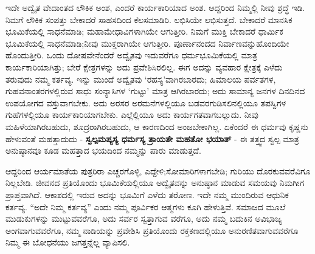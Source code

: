 ಇದೇ ಅದ್ವೈತ ವೇದಾಂತದ ಲೌಕಿಕ ಅಂಶ, ಎಂದರೆ ಕಾರ್ಯಕಾರಿಯಾದ ಅಂಶ. ಆದ್ದರಿಂದ ನಿಮ್ಮಲ್ಲಿ ನೀವು ಶ್ರದ್ಧೆ ಇಡಿ. ನಿಮಗೆ ಲೌಕಿಕ ಸಂಪತ್ತು ಬೇಕಾದರೆ ಸಾಹಸದಿಂದ ಕೆಲಸಮಾಡಿರಿ. ಲಭಿಸಿಯೇ ಲಭಿಸುತ್ತದೆ. ಬೇಕಾದರೆ ಮಾನಸಿಕ ಭೂಮಿಕೆಯಲ್ಲಿ ಸಾಧನೆಮಾಡಿ; ಮಹಾಮೇಧಾವಿಗಳಾಗಿಯೇ ಆಗುತ್ತೀರಿ. ನಿಮಗೆ ಮುಕ್ತಿ ಬೇಕಾದರೆ ಧಾರ್ಮಿಕ ಭೂಮಿಕೆಯಲ್ಲಿ ಸಾಧನೆಮಾಡಿ;\break ನೀವು ಮುಕ್ತರಾಗಿಯೇ ಆಗುತ್ತೀರಿ. ಪೂರ್ಣಾನಂದದ ನಿರ್ವಾಣವನ್ನು\break ಹೊಂದಿಯೇ ಹೊಂದುತ್ತೀರಿ. ಒಂದು ದೋಷವೇನೆಂದರೆ ಅದ್ವೈತವು ಇದುವರೆಗೂ ಧರ್ಮಭೂಮಿಕೆಯಲ್ಲಿ ಮಾತ್ರ ಕಾರ್ಯಕಾರಿಯಾಗಿತ್ತು; ಬೇರೆ ಕ್ಷೇತ್ರಗಳನ್ನು ಅದು ಪ್ರವೇಶಿಸಿರಲಿಲ್ಲ. ಈಗ ಅದನ್ನು ವ್ಯವಹಾರ ಕ್ಷೇತ್ರಕ್ಕೆ ಎಳೆದು ತರುವುದು ನಮ್ಮ ಕರ್ತವ್ಯ. ಇನ್ನು ಮುಂದೆ ಅದ್ವೈತವು ‘ರಹಸ್ಯ’ವಾಗಿರ\-ಬಾರದು; ಹಿಮಾಲಯ ಪರ್ವತಗಳ, ಗುಹವನಾಂತರಗಳಲ್ಲಿರುವ ಸಾಧು ಸಂನ್ಯಾಸಿಗಳ ‘ಗುಟ್ಟು’ ಮಾತ್ರ ಆಗಿರಬಾರದು; ಅದು ಸಾಮಾನ್ಯ ಜನಗಳ ದಿನದಿನದ ಉಪಯೋಗದ ವಸ್ತುವಾಗಬೇಕು. ಅದು ಅರಸರ ಅರಮನೆಗಳಲ್ಲಿಯೂ ಬಡವರ\break ಗುಡಿಸಲಿನಲ್ಲಿಯೂ ತಪಸ್ವಿಗಳ ಗುಹೆಗಳಲ್ಲಿಯೂ ಕಾರ್ಯಕಾರಿಯಾಗಬೇಕು. ಎಲ್ಲೆಲ್ಲಿಯೂ ಅದು ಕಾರ್ಯಗತವಾಗಬಲ್ಲುದು. ನೀವು ಮಹಿಳೆಯಾಗಿರಬಹುದು, ಶೂದ್ರರಾಗಿರಬಹುದು, ಆ ಕಾರಣದಿಂದ ಅಂಜಬೇಕಾಗಿಲ್ಲ. ಏಕೆಂದರೆ ಈ ಧರ್ಮವು ಕೃಷ್ಣನು ಹೇಳುವಂತೆ ಮಹತ್ತಾದುದು - \textbf{ಸ್ವಲ್ಪಮಪ್ಯಸ್ಯ ಧರ್ಮಸ್ಯ ತ್ರಾಯತೇ ಮಹತೋ ಭಯಾತ್​} - ಈ ತತ್ತ್ವದ ಸ್ವಲ್ಪ ಮಾತ್ರ ಅನುಷ್ಠಾನವೂ ಕೂಡ ಮಹತ್ತಾದ ಭಯದಿಂದ ನಮ್ಮನ್ನು ಪಾರು ಮಾಡುತ್ತದೆ.

ಆದ್ದರಿಂದ ಆರ್ಯಮಾತೆಯ ಪುತ್ರರಿರಾ ಎಚ್ಚರಗೊಳ್ಳಿ, ಎದ್ದೇಳಿ;\break ಸೋಮಾರಿಗಳಾಗಬೇಡಿ; ಗುರಿಯು ದೊರಕುವವರೆವಿಗೂ ನಿಲ್ಲಬೇಡಿ. ಜೀವನದ ಪ್ರತಿಯೊಂದು ಭೂಮಿಕೆಯಲ್ಲಿಯೂ ಅದ್ವೈತವನ್ನು ಅನುಷ್ಠಾನ ಮಾಡುವ ಸಮಯವು ನಿಮಗೀಗ ಪ್ರಾಪ್ತವಾಗಿದೆ. ಆಕಾಶದಲ್ಲಿ ಇರುವ ಅದನ್ನು ಭೂಮಿಗೆ ಎಳೆದು ತರೋಣ. ಇದೇ ನಮ್ಮ ಮುಂದಿರುವ ಆಧುನಿಕ ಕರ್ತವ್ಯ. “ಅದೇ ನಿಮ್ಮ ಕರ್ತವ್ಯ” ಎಂದು ನಮ್ಮ ಪೂರ್ವಿಕರ ಆತ್ಮಗಳು ಕೂಗಿ ಹೇಳುತ್ತಿವೆ. ಸಮಾಜದ ಮೂಲೆ ಮುಡುಕುಗಳನ್ನು ಮುಟ್ಟುವವರೆಗೂ, ಅದು ಸರ್ವರ ಸ್ವತ್ತಾಗುವ ವರೆಗೂ, ಅದು ನಮ್ಮ ಬದುಕಿನ ಅವಿಭಾಜ್ಯ ಅಂಗವಾಗುವವರೆಗೂ, ನಮ್ಮ ನಾಡಿಯನ್ನು ಪ್ರವೇಶಿಸಿ ಪ್ರತಿಯೊಂದು ರಕ್ತಕಣದಲ್ಲಿಯೂ ಅನುರಣಿತವಾಗುವವರೆಗೂ ನಿಮ್ಮ ಈ ಬೋಧನೆಯು ಜಗತ್ತನ್ನೆಲ್ಲ ವ್ಯಾಪಿಸಲಿ.

\vskip 2pt

